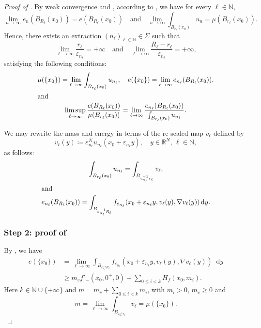 \documentclass[JEP,XML,SOM,Unicode,published]{cedram}
\theoremstyle{plain}
\theoremstyle{definition}
\newcommand{\dd}{\mathop{}\mathopen{}\mathrm{d}}
\newcommand{\N}{\mathbb{N}}
\newcommand{\R}{\mathbb{R}}
\newcommand{\eps}{\varepsilon}
\begin{document}
\begin{proof}[Proof of ]
By weak convergence and , according to \cite[Prop.\,1.62~b)]{ambrosioFunctionsBoundedVariation2000}, we have for every \(\ell\in\N\),
\[
\lim_{n\to\infty}e_n(B_{R_\ell}(x_0))=e(B_{R_\ell}(x_0))\quad\text{and} \quad \lim_{n\to\infty}\int_{B_{r_\ell}(x_0)}u_n=\mu(B_{r_\ell}(x_0)).
\]
Hence, there exists an extraction \((n_\ell)_{\ell\in\N} \in \Sigma\) such that
\begin{equation}\label{radiiCovering}
\lim_{\ell\to\infty}\frac{r_\ell}{\eps_{n_\ell}}=+\infty \quad \text{and}\quad \lim_{\ell\to\infty}\frac{R_\ell-r_\ell}{\eps_{n_\ell}}=+\infty,
\end{equation}
satisfying the following conditions:
\begin{gather}
\label{atomsMassEnergy}
\mu(\{x_0\})=\lim_{\ell\to\infty}\int_{B_{r_\ell}(x_0)}u_{n_\ell},
\quad
e(\{x_0\}) = \lim_{\ell\to\infty} e_{n_\ell}(B_{R_\ell}(x_0)),
\\
\shortintertext{and}
\label{densityExtraction}
\limsup_{\ell\to\infty}\frac{e(B_{R_\ell}(x_0))}{\mu(B_{r_\ell}(x_0))}
=\lim_{\ell\to\infty}\frac{e_{n_\ell}(B_{R_\ell}(x_0))}{\int_{B_{r_\ell}(x_0)}u_{n_\ell}}.
\end{gather}

We may rewrite the mass and energy in terms of the re-scaled map \(v_\ell\) defined by
\begin{equation}
v_\ell(y)\coloneqq \eps_{n_\ell}^N u_{n_\ell}(x_0+\eps_{n_\ell} y),\quad y\in\R^N,\, \ell\in\N,
\end{equation}
as follows:
\begin{gather}\label{expressionRescaledMass}
\int_{B_{r_\ell}(x_0)}u_{n_\ell}=\int_{B_{\eps_{n_\ell}^{-1}r_{\ell}}}v_\ell,\\
\shortintertext{and}
\label{expressionRescaledEnergy}
e_{n_\ell}(B_{R_\ell}(x_0))=\int_{B_{\eps_{n_\ell}^{-1}R_{\ell}}}f_{\eps_{n_\ell}}(x_0+\eps_{n_\ell} y,v_{\ell}(y),\nabla v_{\ell}(y))\dd y.
\end{gather}

\subsubsection*{Step 2: proof of } By , we have
\begin{equation}
\label{lowerEnergyBound}\begin{aligned}
e(\{x_0\}) &= \lim_{\ell\to\infty} \int_{B_{\eps_{n_\ell}^{-1}R_{\ell}}}f_{\eps_{n_\ell}}(x_0+\eps_{n_\ell} y,v_{\ell}(y),\nabla v_{\ell}(y))\dd y\\
&\geq m_v f'_{-}(x_0,0^+,0)+\sum_{0\leq i<k} H_f(x_0,m_i).\end{aligned}
\end{equation}
Here \(k\in\N\cup\{+\infty\}\) and \(m=m_v+\sum_{0\leq i<k}m_i\), with \(m_i> 0\), \(m_v\geq 0\) and
\[
m=\lim_{\ell\to\infty} \int_{B_{\eps_{n_\ell}^{-1}r_{\ell}}}v_\ell =\mu(\{x_0\}).
\]


\end{proof}
\end{document}
